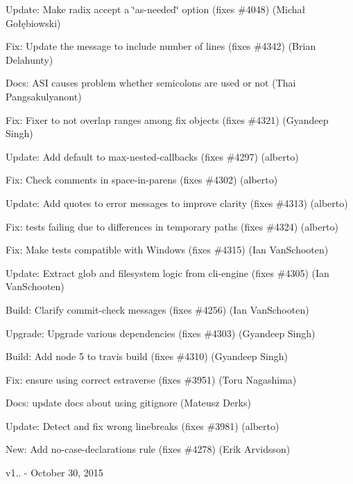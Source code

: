 \begin{DoxyItemize}
\item Update\+: Make radix accept a \char`\"{}as-\/needed\char`\"{} option (fixes \#4048) (Michał Gołębiowski)
\item Fix\+: Update the message to include number of lines (fixes \#4342) (Brian Delahunty)
\item Docs\+: A\+SI causes problem whether semicolons are used or not (Thai Pangsakulyanont)
\item Fix\+: Fixer to not overlap ranges among fix objects (fixes \#4321) (Gyandeep Singh)
\item Update\+: Add default to {\ttfamily max-\/nested-\/callbacks} (fixes \#4297) (alberto)
\item Fix\+: Check comments in space-\/in-\/parens (fixes \#4302) (alberto)
\item Update\+: Add quotes to error messages to improve clarity (fixes \#4313) (alberto)
\item Fix\+: tests failing due to differences in temporary paths (fixes \#4324) (alberto)
\item Fix\+: Make tests compatible with Windows (fixes \#4315) (Ian Van\+Schooten)
\item Update\+: Extract glob and filesystem logic from cli-\/engine (fixes \#4305) (Ian Van\+Schooten)
\item Build\+: Clarify commit-\/check messages (fixes \#4256) (Ian Van\+Schooten)
\item Upgrade\+: Upgrade various dependencies (fixes \#4303) (Gyandeep Singh)
\item Build\+: Add node 5 to travis build (fixes \#4310) (Gyandeep Singh)
\item Fix\+: ensure using correct estraverse (fixes \#3951) (Toru Nagashima)
\item Docs\+: update docs about using gitignore (Mateusz Derks)
\item Update\+: Detect and fix wrong linebreaks (fixes \#3981) (alberto)
\item New\+: Add no-\/case-\/declarations rule (fixes \#4278) (Erik Arvidsson)
\end{DoxyItemize}

v1.. -\/ October 30, 2015


